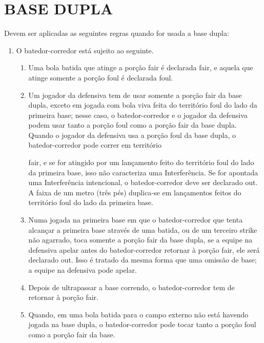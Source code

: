 \section{BASE DUPLA}
 Devem ser aplicadas as seguintes regras quando for usada a base dupla:
\begin{enumerate}[label=(\alph*)]
	\item O batedor-corredor está sujeito ao seguinte.

	\begin{enumerate}[label=\roman*.]
		\item Uma bola batida que atinge a porção \gls{fair} é declarada \gls{fair}, e aquela que atinge somente a porção \gls{foul} é declarada \gls{foul}.

		\item Um jogador da defensiva tem de usar somente a porção \gls{fair} da base dupla, exceto em jogada com bola viva feita do território \gls{foul} do lado da primeira base;
	  nesse caso, o batedor-corredor e o jogador da defensiva podem usar tanto a  porção \gls{foul} como a porção \gls{fair} da base dupla. Quando o jogador da defensiva  usa a porção \gls{foul} da base dupla, o batedor-corredor pode correr em território

	\gls{fair}, e se for atingido por um lançamento feito do território \gls{foul} do lado da primeira base, isso não caracteriza uma Interferência. Se for apontada uma Interferência intencional, o batedor-corredor deve ser declarado \gls{out}. A faixa  de um metro (três pés) duplica-se em lançamentos feitos do território \gls{foul} do lado da primeira base.

		\item Numa jogada na primeira base em que o batedor-corredor que tenta alcançar a primeira base através de uma batida, ou de um terceiro \gls{strike} não agarrado, toca somente a porção \gls{fair} da base dupla, se a equipe na defensiva apelar antes do batedor-corredor retornar à porção \gls{fair}, ele será declarado \gls{out}. Isso é tratado da mesma forma que uma omissão de base; a equipe na defensiva  pode apelar.

		\item  Depois de ultrapassar a base correndo, o batedor-corredor tem de retornar à porção \gls{fair}.

		\item Quando, em uma bola batida para o campo externo não está havendo jogada na base dupla, o batedor-corredor pode tocar tanto a porção \gls{foul} como a porção \gls{fair} da base.
	\end{enumerate}


\end{enumerate}

